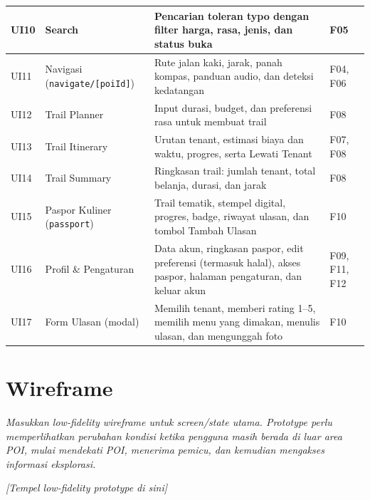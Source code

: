 \begin{longtable}{|L{0.092}|L{0.184}|L{0.507}|L{0.217}|}
UI10 & Search & Pencarian toleran typo dengan filter harga, rasa, jenis, dan status buka & F05 \\ \hline
UI11 & Navigasi (\texttt{navigate/[poiId]}) & Rute jalan kaki, jarak, panah kompas, panduan audio, dan deteksi kedatangan & F04, F06 \\ \hline
UI12 & Trail Planner & Input durasi, budget, dan preferensi rasa untuk membuat trail & F08 \\ \hline
UI13 & Trail Itinerary & Urutan tenant, estimasi biaya dan waktu, progres, serta Lewati Tenant & F07, F08 \\ \hline
UI14 & Trail Summary & Ringkasan trail: jumlah tenant, total belanja, durasi, dan jarak & F08 \\ \hline
UI15 & Paspor Kuliner (\texttt{passport}) & Trail tematik, stempel digital, progres, badge, riwayat ulasan, dan tombol Tambah Ulasan & F10 \\ \hline
UI16 & Profil \& Pengaturan & Data akun, ringkasan paspor, edit preferensi (termasuk halal), akses paspor, halaman pengaturan, dan keluar akun & F09, F11, F12 \\ \hline
UI17 & Form Ulasan (modal) & Memilih tenant, memberi rating 1--5, memilih menu yang dimakan, menulis ulasan, dan mengunggah foto & F10 \\ \hline
\end{longtable}

\section{Wireframe}

\textit{Masukkan low-fidelity wireframe untuk screen/state utama. Prototype perlu memperlihatkan perubahan kondisi ketika pengguna masih berada di luar area POI, mulai mendekati POI, menerima pemicu, dan kemudian mengakses informasi eksplorasi.}

\textit{[Tempel low-fidelity prototype di sini]}
